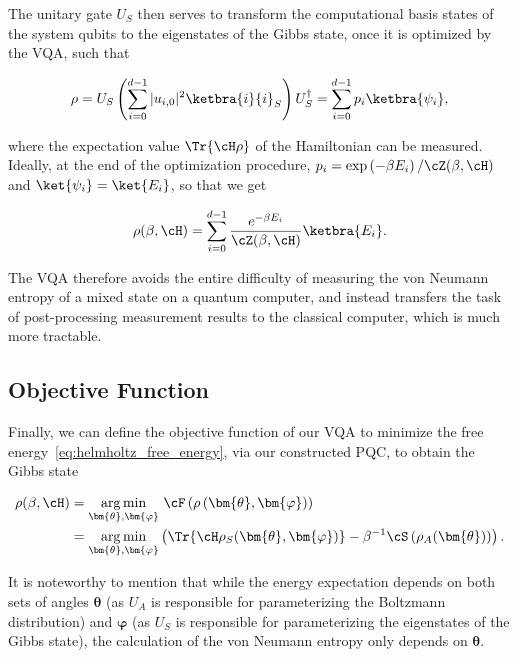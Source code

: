 The unitary gate $U_S$ then serves to transform the computational
basis states of the system qubits to the eigenstates of the Gibbs
state, once it is optimized by the \ac{VQA}, such that


\begin{align}
    \rho = U_S \left( \sum_{i=0}^{d-1} |u_{i,0}|^2 \ketbra{i}{i}_S \right) U_S^\dagger = \sum_{i=0}^{d - 1} p_i \ketbra{\psi_i},
\end{align}

where the expectation value $\Tr{\cH \rho}$ of the Hamiltonian can be
measured. Ideally, at the end of the optimization procedure, $p_i =
\exp\left(-\beta E_i\right)/\cZ(\beta, \cH)$ and $\ket{\psi_i} =
\ket{E_i}$, so that we get

\begin{equation}
    \rho(\beta, \cH) = \sum_{i=0}^{d - 1} \frac{e^{-\beta E_i}}{\cZ(\beta, \cH)} \ketbra{E_i}.
\end{equation}

The \ac{VQA} therefore avoids the entire difficulty of measuring the
von Neumann entropy of a mixed state on a quantum computer, and
instead transfers the task of post-processing measurement results to
the classical computer, which is much more tractable.

\subsection{Objective Function}

Finally, we can define the objective function of our \ac{VQA} to
minimize the free energy~\eqref{eq:helmholtz_free_energy}, via our
constructed \ac{PQC}, to obtain the Gibbs state

\begin{align}
    \rho(\beta, \cH) &= \underset{\bm{\theta}, \bm{\varphi}}{\arg\min} \ \cF\left(\rho\left(\bm{\theta}, \bm{\varphi}\right)\right) \nonumber \\ &= \underset{\bm{\theta}, \bm{\varphi}}{\arg\min} \left( \Tr{\cH \rho_S(\bm{\theta}, \bm{\varphi})} - \beta^{-1}\cS\left(\rho_A(\bm{\theta})\right) \right).
    \label{eq:gibbs_state}
\end{align}

It is noteworthy to mention that while the energy expectation depends
on both sets of angles $\bm{\theta}$ (as $U_A$ is responsible for
parameterizing the Boltzmann distribution) and $\bm{\varphi}$ (as
$U_S$ is responsible for parameterizing the eigenstates of the Gibbs
state), the calculation of the von Neumann entropy only depends on
$\bm{\theta}$.

